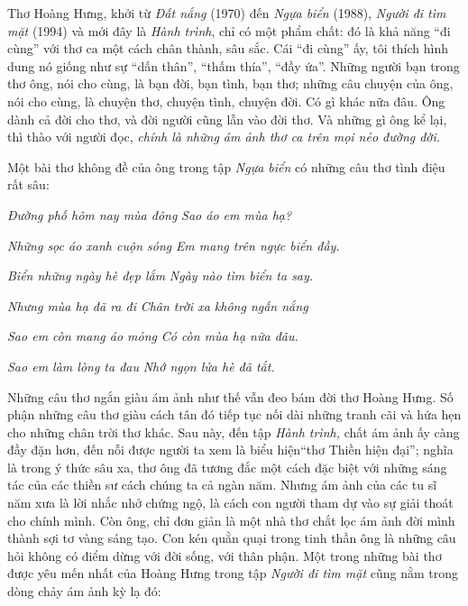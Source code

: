 \documentclass[../main.tex]{subfiles}
\begin{document}
\begin{multicols}{2}
Thơ Hoàng Hưng, khởi từ \textit{Đất nắng} (1970) đến \textit{Ngựa biển} (1988), \textit{Người đi tìm mặt} (1994) và mới đây là \textit{Hành trình}, chỉ có một phẩm chất: đó là khả năng “đi cùng” với thơ ca một cách chân thành, sâu sắc. Cái “đi cùng” ấy, tôi thích hình dung nó giống như sự “dấn thân”, “thấm thía”, “đầy ứa”. Những người bạn trong thơ ông, nói cho cùng, là bạn đời, bạn tình, bạn thơ; những câu chuyện của ông, nói cho cùng, là chuyện thơ, chuyện tình, chuyện đời. Có gì khác nữa đâu. Ông dành cả đời cho thơ, và đời người cũng lẫn vào đời thơ. Và những gì ông kể lại, thì thào với người đọc, \textit{chính là những ám ảnh thơ ca trên mọi nẻo đường đời.}  
 
Một bài thơ không đề của ông trong tập \textit{Ngựa biển }có những câu thơ tình điệu rất sâu:        
\begin{blockquote}
        
\textit{Đường phố hôm nay mùa đông} 
\textit{Sao áo em mùa hạ?} 
        
\textit{Những sọc áo xanh cuộn sóng} 
\textit{Em mang trên ngực biển đầy.} 
        
\textit{Biển những ngày hè đẹp lắm} 
\textit{Ngày nào tìm biển ta say.} 
        
\textit{Nhưng mùa hạ đã ra đi } 
\textit{Chân trời xa không ngấn nắng} 
        
\textit{Sao em còn mang áo mỏng} 
\textit{Có còn mùa hạ nữa đâu.} 
        
\textit{Sao em làm lòng ta đau} 
\textit{Nhớ ngọn lửa hè đã tắt. } 

\end{blockquote}
 
Những câu thơ ngắn giàu ám ảnh như thế vẫn đeo bám đời thơ Hoàng Hưng. Số phận những câu thơ giàu cách tân đó tiếp tục nối dài những tranh cãi và hứa hẹn cho những chân trời thơ khác. Sau này, đến tập \textit{Hành trình, }chất ám ảnh ấy càng đầy đặn hơn, đến nỗi được người ta xem là biểu hiện“thơ Thiền hiện đại”; nghĩa là trong ý thức sâu xa, thơ ông đã tương đắc một cách đặc biệt với những sáng tác của các thiền sư cách chúng ta cả ngàn năm. Nhưng ám ảnh của các tu sĩ năm xưa là lời nhắc nhở chứng ngộ, là cách con người tham dự vào sự giải thoát cho chính mình. Còn ông, chỉ đơn giản là một nhà thơ chắt lọc ám ảnh đời mình thành sợi tơ vàng sáng tạo. Con kén quằn quại trong tinh thần ông là những câu hỏi không có điểm dừng với đời sống, với thân phận. Một trong những bài thơ được yêu mến nhất của Hoàng Hưng trong tập \textit{Người đi tìm mặt }cũng nằm trong dòng chảy ám ảnh kỳ lạ đó:         
\begin{blockquote}
        

\end{blockquote}
\end{multicols}
\end{document}
